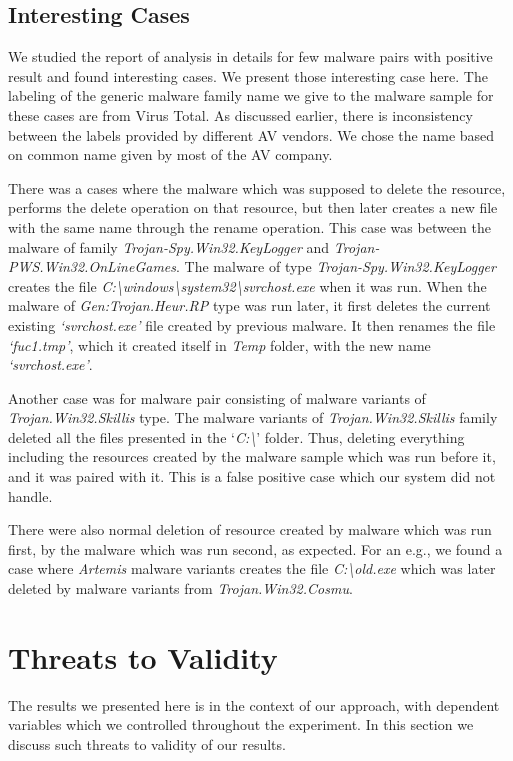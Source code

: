 \subsection{Interesting Cases}
\label{sub:Interesting Cases}
We studied the report of analysis in details for few malware pairs with positive result and found interesting cases.
We present those interesting case here.
The labeling of the generic malware family name we give to the malware sample for these cases are from Virus Total.
As discussed earlier, there is inconsistency between the labels provided by different AV vendors.
We chose the name based on common name given by most of the AV company.

There was a cases where the malware which was supposed to delete the resource, performs the delete operation on that resource, but then later creates a new file with the same name through the rename operation.
This case was between the malware of family \emph{Trojan-Spy.Win32.KeyLogger} and \emph{Trojan-PWS.Win32.OnLineGames}.
The malware of type \emph{Trojan-Spy.Win32.KeyLogger} creates the file \emph{C:\textbackslash windows\textbackslash system32\textbackslash svrchost.exe} when it was run. %
When the malware of \emph{Gen:Trojan.Heur.RP} type was run later, it first deletes the current existing \emph{`svrchost.exe'} file created by previous malware.
It then renames the file \emph{`fuc1.tmp'}, which it created itself in \emph{Temp} folder, with the new name \emph{`svrchost.exe'}.

Another case was for malware pair consisting of malware variants of \emph{Trojan.Win32.Skillis} type.
The malware variants of \emph{Trojan.Win32.Skillis} family deleted all the files presented in the `\emph{C:\textbackslash}' folder.
Thus, deleting everything including the resources created by the malware sample which was run before it, and it was paired with it.
This is a false positive case which our system did not handle.

There were also normal deletion of resource created by malware which was run first, by the malware which was run second, as expected.
For an e.g., we found a case where \emph{Artemis} malware variants creates the file \emph{C:\textbackslash old.exe} which was later deleted by malware variants from \emph{Trojan.Win32.Cosmu}.
\section{Threats to Validity}
\label{sec:Threats to Validity}
The results we presented here is in the context of our approach, with dependent variables which we controlled throughout the experiment.
In this section we discuss such threats to validity of our results.

